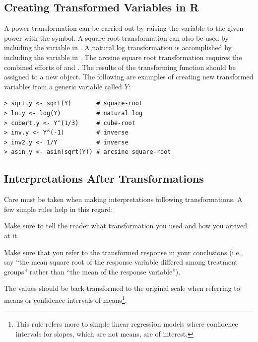 \documentclass[10pt,openany]{book}\usepackage[]{graphicx}\usepackage[]{color}
\begin{document}

\subsection{Creating Transformed Variables in R}
A power transformation can be carried out by raising the variable to the given power with the \R{\^} symbol.  A square-root transformation can also be used by including the variable in .  A natural log transformation is accomplished by including the variable in .  The arcsine square root transformation requires the combined efforts of  and .  The results of the transforming function should be assigned to a new object.  The following are examples of creating new transformed variables from a generic variable called $Y$:

\begin{Verbatim}[formatcom=\color{red},xleftmargin=5mm]
> sqrt.y <- sqrt(Y)       # square-root
> ln.y <- log(Y)          # natural log
> cubert.y <- Y^(1/3)     # cube-root
> inv.y <- Y^(-1)         # inverse
> inv2.y <- 1/Y           # inverse
> asin.y <- asin(sqrt(Y)) # arcsine square-root
\end{Verbatim}


\subsection{Interpretations After Transformations} \label{sect:AOVTransformationsInterp}
Care must be taken when making interpretations following transformations.  A few simple rules help in this regard:
\begin{Enumerate}
  \item Make sure to tell the reader what transformation you used and how you arrived at it.
  \item Make sure that you refer to the transformed response in your conclusions (i.e., say ``the mean square root of the response variable differed among treatment groups'' rather than ``the mean of the response variable'').
  \item The values should be back-transformed to the original scale when referring to means or confidence intervals of means\footnote{This rule refers more to simple linear regression models where confidence intervals for slopes, which are not means, are of interest.}.
\end{Enumerate}
\end{document}
